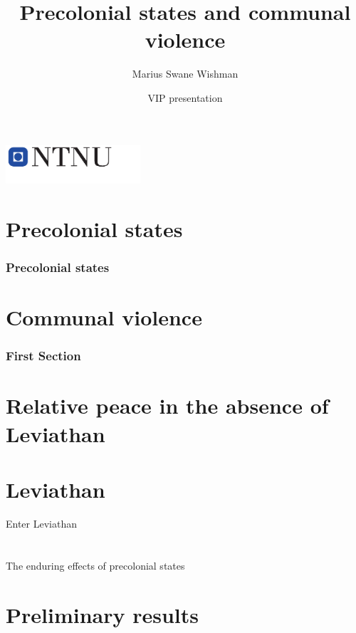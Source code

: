 \documentclass{beamer}
\title[Communal violence]{Precolonial states and communal violence}
\subtitle{}
\author[Wishman]{Marius Swane Wishman}
\date{VIP presentation}
\institute{ISS}
\begin{document}
\begin{frame}[plain]
\titlepage 
\centering
\includegraphics[width=5cm]{img/logo_ntnu_u-slagord.pdf} 
\end{frame}

\section{Precolonial states} 

\begin{frame}
\frametitle{Precolonial states} 
\end{frame}

\section{Communal violence}

\begin{frame}
\frametitle{First Section}
	
\end{frame}

\section{Relative peace in the absence of Leviathan}

\section{Leviathan}

\begin{frame}{Enter Leviathan}

	

\end{frame}

\section{}

\begin{frame}{The enduring effects of precolonial states}

	

\end{frame}

\section{Preliminary results}
\end{document}

